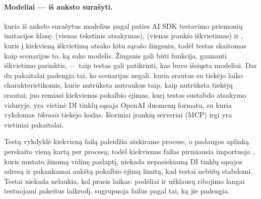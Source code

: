 \paragraph{Modeliai --- iš anksto surašyti.}  kuria iš anksto
surašytus modelius pagal paties AI SDK testavimo priemonių imitacijos klasę: 
(vienas tekstinis atsakymas),  (vienas įrankio iškvietimas) ir
, kuris į kiekvieną iškvietimą atsako kitu sąrašo žingsniu, todėl testas skaitomas
kaip scenarijus to, ką sako modelis. Žingsnis gali būti funkcija, gaunanti iškvietimo
parinktis, --- taip testas gali patikrinti, kas buvo išsiųsta modeliui. Dar du pakaitalai
padengia tai, ko scenarijus negali.  kuria srautus su tiekėjo
laiko charakteristikomis, kurie nutrūksta nutraukus taip, kaip nutrūksta tiekėjų srautai; juo
remiasi kiekvienas pokalbio ėjimas, kurį testas sustabdo atsakymo viduryje.
 yra vietinė DI tinklų sąsaja OpenAI duomenų formatu, su
kuria vykdomas \emph{tikrasis} tiekėjo kodas. Išoriniai įrankių serveriai (MCP) irgi yra vietiniai
pakaitalai.

Testų vykdyklė kiekvieną failą paleidžia atskirame procese, o paslaugos  aplinką
perskaito vieną kartą per procesą; todėl kiekvienas failas pirmiausia importuoja
, kuris nustato žinomą vidinę paslaptį, niekada nepasiekiamą DI tinklų
sąsajos adresą ir pakankamai aukštą pokalbio ėjimų limitą, kad testai nebūtų stabdomi. Testai
niekada nelaukia, kol praeis laikas: podėliai ir užklausų ribojimo langai testuojami pakeitus laikrodį.
 sugrupuoja failus pagal tai, ką jie padengia.

